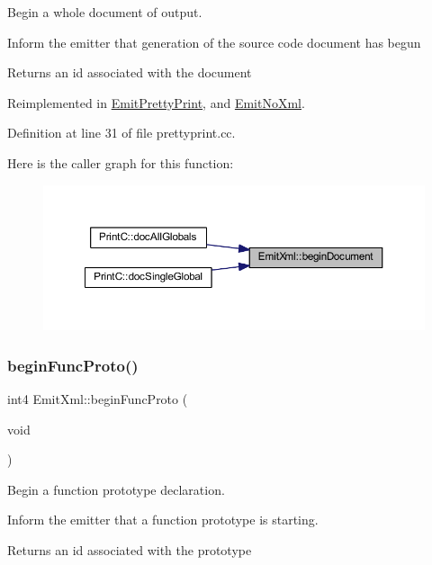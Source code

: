 Begin a whole document of output. 

Inform the emitter that generation of the source code document has begun \begin{DoxyReturn}{Returns}
an id associated with the document 
\end{DoxyReturn}


Reimplemented in \mbox{\hyperlink{class_emit_pretty_print_a7d26817d23a381a55e78d4c7caf225f1}{Emit\+Pretty\+Print}}, and \mbox{\hyperlink{class_emit_no_xml_ac2cedec116ad98013fe4d7c00b230793}{Emit\+No\+Xml}}.



Definition at line 31 of file prettyprint.\+cc.

Here is the caller graph for this function\+:
\nopagebreak
\begin{figure}[H]
\begin{center}
\leavevmode
\includegraphics[width=350pt]{class_emit_xml_a9a4891144e0743f2b10faa32e6d34181_icgraph}
\end{center}
\end{figure}
\mbox{\label{class_emit_xml_acaf7a29dd1eb427f20e99dccf3581f59}} 
\subsubsection{\texorpdfstring{beginFuncProto()}{beginFuncProto()}}
{\footnotesize\ttfamily int4 Emit\+Xml\+::begin\+Func\+Proto (\begin{DoxyParamCaption}\item[{void}]{ }\end{DoxyParamCaption})\hspace{0.3cm}{\ttfamily [virtual]}}



Begin a function prototype declaration. 

Inform the emitter that a function prototype is starting. \begin{DoxyReturn}{Returns}
an id associated with the prototype 
\end{DoxyReturn}


